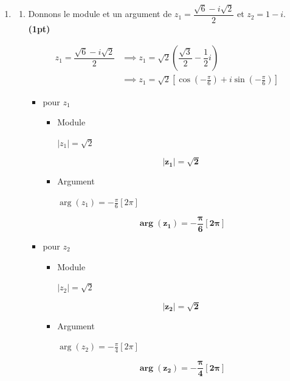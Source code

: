 \documentclass[12pt,a4paper]{article}
\begin{document}
\begin{enumerate}
\begin{enumerate}
\begin{itemize}
\end{itemize}        
        
    \end{enumerate}
    \item 
    \begin{enumerate}
        \item Donnons le module et un argument de $z_1 = \dfrac{\sqrt{6}-i\sqrt{2}}{2}$ et $z_2 = 1 - i$. \hfill \textbf{(1pt)}


\begin{align*}
z_1 = \dfrac{\sqrt{6}-i\sqrt{2}}{2} &\implies z_1 = \sqrt{2} \left( \dfrac{\sqrt{3}}{2}-\dfrac{1}{2}i \right)\\
                                    &\implies z_1 = \sqrt{2} \left[ \cos\left( -\frac{\pi}{6} \right) + i \sin\left( -\frac{\pi}{6} \right) \right]
\end{align*}


\begin{itemize}
\item pour $z_1$
\begin{itemize}
\item Module

 $|z_1|= \sqrt{2}$
\begin{resultbox}
    \[
    \mathbf{ |z_1|= \sqrt{2} }
    \]
\end{resultbox}

\item Argument

 $\arg(z_1) = -\frac{\pi}{6}[2\pi]$
\begin{resultbox}
    \[
    \mathbf{ \arg(z_1) = -\frac{\pi}{6}[2\pi] }
    \]
\end{resultbox}

\end{itemize} 
\item pour $z_2$
\begin{itemize}
\item Module

 $|z_2|= \sqrt{2}$
\begin{resultbox}
    \[
    \mathbf{ |z_2|= \sqrt{2} }
    \]
\end{resultbox}

\item Argument

 $\arg(z_2) = -\frac{\pi}{4}[2\pi]$
\begin{resultbox}
    \[
    \mathbf{ \arg(z_2) = -\frac{\pi}{4}[2\pi] }
    \]
\end{resultbox}


\end{itemize}
\end{itemize}
\end{enumerate}
\end{enumerate}
\end{document}
